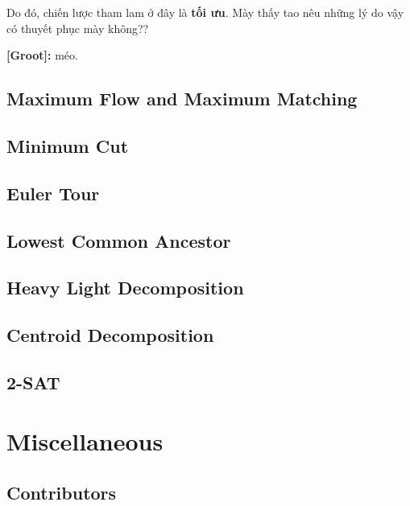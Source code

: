 \documentclass{article}
\begin{document}
Do đó, chiến lược tham lam ở đây là \textbf{tối ưu}. Mày thấy tao nêu những lý do vậy có thuyết phục mày không??

\textbf{[Groot]:} méo.
 

\subsection{Maximum Flow and Maximum Matching}

\subsection{Minimum Cut}
\subsection{Euler Tour}
\subsection{Lowest Common Ancestor}
\subsection{Heavy Light Decomposition}
\subsection{Centroid Decomposition}
\subsection{2-SAT}
 


\section{Miscellaneous}

\subsection{Contributors}



\printbibliography[heading=bibintoc]
	
\end{document}
